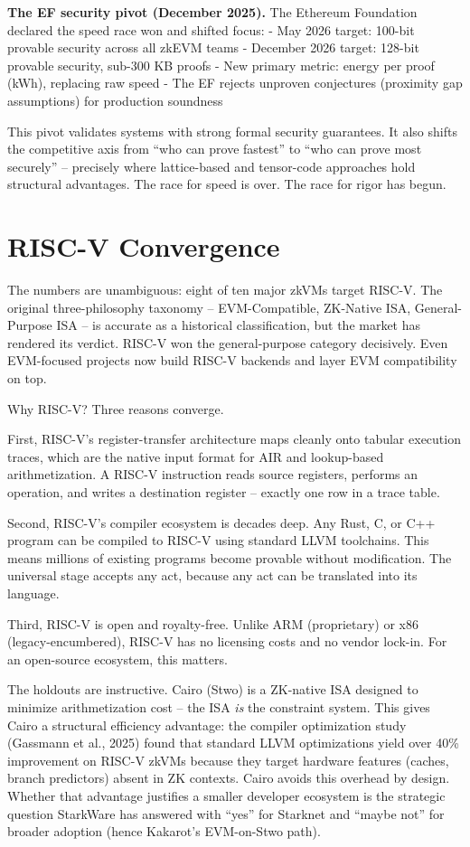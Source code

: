 \documentclass[
  11pt,
  openany]{report}
\renewcommand{\textbf}[1]{{\bfseries\color{MidnightBold}#1}}
\begin{document}
\textbf{The EF security pivot (December 2025).} The Ethereum Foundation declared
the speed race won and shifted focus: - May 2026 target: 100-bit provable
security across all zkEVM teams - December 2026 target: 128-bit provable
security, sub-300 KB proofs - New primary metric: energy per proof (kWh),
replacing raw speed - The EF rejects unproven conjectures (proximity gap
assumptions) for production soundness

This pivot validates systems with strong formal security guarantees. It also
shifts the competitive axis from ``who can prove fastest'' to ``who can prove
most securely'' -- precisely where lattice-based and tensor-code approaches hold
structural advantages. The race for speed is over. The race for rigor has begun.

\section{RISC-V Convergence}\label{risc-v-convergence}

The numbers are unambiguous: eight of ten major zkVMs target RISC-V. The
original three-philosophy taxonomy -- EVM-Compatible, ZK-Native ISA,
General-Purpose ISA -- is accurate as a historical classification, but the
market has rendered its verdict. RISC-V won the general-purpose category
decisively. Even EVM-focused projects now build RISC-V backends and layer EVM
compatibility on top.

Why RISC-V? Three reasons converge.

First, RISC-V's register-transfer architecture maps cleanly onto tabular
execution traces, which are the native input format for AIR and lookup-based
arithmetization. A RISC-V instruction reads source registers, performs an
operation, and writes a destination register -- exactly one row in a trace
table.

Second, RISC-V's compiler ecosystem is decades deep. Any Rust, C, or C++ program
can be compiled to RISC-V using standard LLVM toolchains. This means millions of
existing programs become provable without modification. The universal stage
accepts any act, because any act can be translated into its language.

Third, RISC-V is open and royalty-free. Unlike ARM (proprietary) or x86
(legacy-encumbered), RISC-V has no licensing costs and no vendor lock-in. For an
open-source ecosystem, this matters.

The holdouts are instructive. Cairo (Stwo) is a ZK-native ISA designed to
minimize arithmetization cost -- the ISA \emph{is} the constraint system. This
gives Cairo a structural efficiency advantage: the compiler optimization study
(Gassmann et al., 2025) found that standard LLVM optimizations yield over 40\%
improvement on RISC-V zkVMs because they target hardware features (caches,
branch predictors) absent in ZK contexts. Cairo avoids this overhead by design.
Whether that advantage justifies a smaller developer ecosystem is the strategic
question StarkWare has answered with ``yes'' for Starknet and ``maybe not'' for
broader adoption (hence Kakarot's EVM-on-Stwo path).
\end{document}
